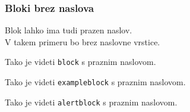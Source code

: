 \documentclass{beamer}
\begin{document}


\begin{frame}
      \frametitle{Bloki brez naslova}
      Blok lahko ima tudi prazen naslov.
      \\V takem primeru bo brez naslovne vrstice.         
         \begin{block}

            Tako je videti \texttt{block} s praznim naslovom.
         \end{block}         
         \begin{exampleblock}

            Tako je videti \texttt{exampleblock} s praznim naslovom.
         \end{exampleblock}      
         \begin{alertblock}

            Tako je videti \texttt{alertblock} s praznim naslovom.
         \end{alertblock}
\end{frame}

\end{document}
